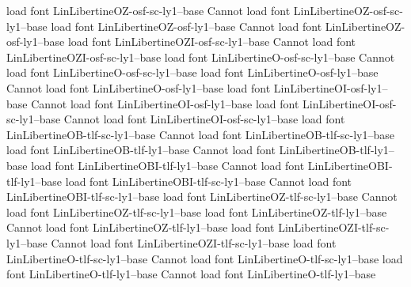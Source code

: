 load font	LinLibertineOZ-osf-sc-ly1--base
Cannot load font LinLibertineOZ-osf-sc-ly1--base
load font	LinLibertineOZ-osf-ly1--base
Cannot load font LinLibertineOZ-osf-ly1--base
load font	LinLibertineOZI-osf-sc-ly1--base
Cannot load font LinLibertineOZI-osf-sc-ly1--base
load font	LinLibertineO-osf-sc-ly1--base
Cannot load font LinLibertineO-osf-sc-ly1--base
load font	LinLibertineO-osf-ly1--base
Cannot load font LinLibertineO-osf-ly1--base
load font	LinLibertineOI-osf-ly1--base
Cannot load font LinLibertineOI-osf-ly1--base
load font	LinLibertineOI-osf-sc-ly1--base
Cannot load font LinLibertineOI-osf-sc-ly1--base
load font	LinLibertineOB-tlf-sc-ly1--base
Cannot load font LinLibertineOB-tlf-sc-ly1--base
load font	LinLibertineOB-tlf-ly1--base
Cannot load font LinLibertineOB-tlf-ly1--base
load font	LinLibertineOBI-tlf-ly1--base
Cannot load font LinLibertineOBI-tlf-ly1--base
load font	LinLibertineOBI-tlf-sc-ly1--base
Cannot load font LinLibertineOBI-tlf-sc-ly1--base
load font	LinLibertineOZ-tlf-sc-ly1--base
Cannot load font LinLibertineOZ-tlf-sc-ly1--base
load font	LinLibertineOZ-tlf-ly1--base
Cannot load font LinLibertineOZ-tlf-ly1--base
load font	LinLibertineOZI-tlf-sc-ly1--base
Cannot load font LinLibertineOZI-tlf-sc-ly1--base
load font	LinLibertineO-tlf-sc-ly1--base
Cannot load font LinLibertineO-tlf-sc-ly1--base
load font	LinLibertineO-tlf-ly1--base
Cannot load font LinLibertineO-tlf-ly1--base
